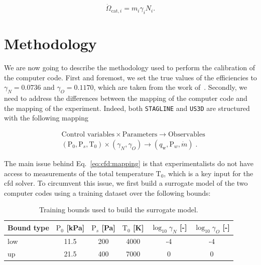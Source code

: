 \begin{equation}
    \dot{\Omega}_{\text{cat},i} = m_i \gamma_i N_i.
\label{eq:omega}
\end{equation} 

\section{Methodology}
\label{sc:cfd:methodology}

We are now going to describe the methodology used to perform the calibration of the computer code. First and foremost, we set the true values of the efficiencies to $\gamma_N = 0.0736$ and $\gamma_O = 0.1170$, which are taken from the work of~\cite{PhDThesis_Bellas}. Secondly, we need to address the differences between the mapping of the computer code and the mapping of the experiment. Indeed, both \texttt{STAGLINE} and \texttt{US3D} are structured with the following mapping


\begin{equation}
    \left.
    \begin{aligned}
        &\text{Control variables} \times \text{Parameters} \rightarrow \text{Observables} \\
        &\left( \text{P}_0, \text{P}_s, \mathrm{T}_0\right) \times (\gamma_N, \gamma_O) \rightarrow \left( q_{\mathrm{w}}, \text{P}_w, \dot{m}\right) \;.
    \end{aligned}
    \right.
    \label{eq:cfd:mapping}
\end{equation}

The main issue behind Eq.~\eqref{eq:cfd:mapping} is that experimentalists do not have access to measurements of the total temperature $\mathrm{T}_0$, which is a key input for the \gls{cfd} solver. To circumvent this issue, we first build a surrogate model of the two computer codes using a training dataset over the following bounds:

\begin{table}[htbp]
  \centering
  \caption{Training bounds used to build the surrogate model.}
  \label{tab:cfd:training_bounds}
  \begin{tabular}{lccccc}
    \toprule
    Bound type & $\text{P}_0$ [kPa] & $\text{P}_s$ [Pa] & $\mathrm{T}_0$ [K] & $\log_{10}\gamma_N$ [-] & $\log_{10}\gamma_O$ [-] \\
    \midrule
    low & 11.5 & 200 & 4000 & -4 & -4 \\
    up  & 21.5 & 400 & 7000 & 0 & 0 \\
    \bottomrule
  \end{tabular}
\end{table}

